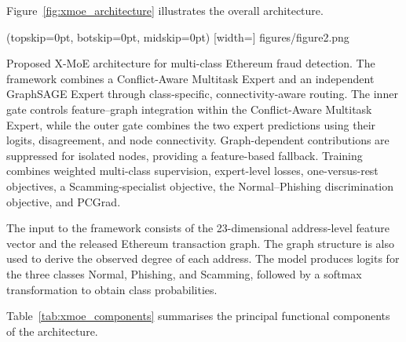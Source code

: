 \documentclass{ieeeaccess}
\begin{document}
Figure~\ref{fig:xmoe_architecture} illustrates the overall architecture.

\Figure[t!](topskip=0pt, botskip=0pt, midskip=0pt)
[width=\textwidth]
{figures/figure2.png}
{\parbox[t]{0.82\textwidth}{\raggedright
Proposed X-MoE architecture for multi-class Ethereum fraud detection.
The framework combines a Conflict-Aware Multitask Expert and an independent
GraphSAGE Expert through class-specific, connectivity-aware routing.
The inner gate controls feature--graph integration within the Conflict-Aware
Multitask Expert, while the outer gate combines the two expert predictions
using their logits, disagreement, and node connectivity.
Graph-dependent contributions are suppressed for isolated nodes, providing
a feature-based fallback. Training combines weighted multi-class supervision,
expert-level losses, one-versus-rest objectives, a Scamming-specialist
objective, the Normal--Phishing discrimination objective, and PCGrad.}
\label{fig:xmoe_architecture}}

The input to the framework consists of the 23-dimensional address-level feature vector and the released Ethereum transaction graph. The graph structure is also used to derive the observed degree of each address. The model produces logits for the three classes
Normal, Phishing, and Scamming, followed by a softmax transformation to obtain class probabilities.

Table~\ref{tab:xmoe_components} summarises the principal functional components of the architecture.
\end{document}
